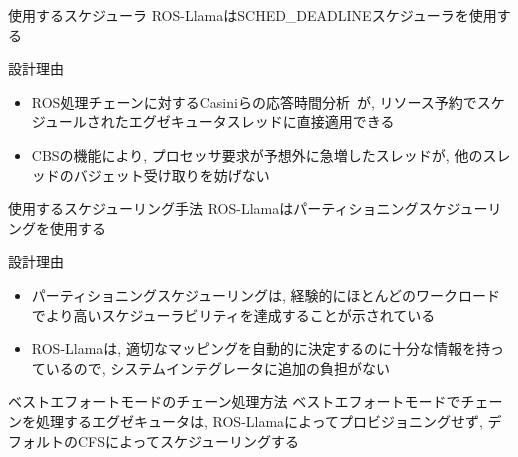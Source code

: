 \begin{frame}{使用するスケジューラ}
    ROS-LlamaはSCHED\_DEADLINEスケジューラを使用する
    \begin{block}{設計理由}
        \setlength{\linewidth}{0.98\columnwidth}
        \begin{itemize}
            \item ROS処理チェーンに対するCasiniらの応答時間分析~\cite{casini2019response}が, リソース予約でスケジュールされたエグゼキュータスレッドに直接適用できる
            \item CBSの機能により, プロセッサ要求が予想外に急増したスレッドが, 他のスレッドのバジェット受け取りを妨げない
        \end{itemize}
    \end{block}
\end{frame}

\begin{frame}{使用するスケジューリング手法}
    ROS-Llamaはパーティショニングスケジューリングを使用する
    \begin{block}{設計理由}
        \setlength{\linewidth}{0.98\columnwidth}
        \begin{itemize}
            \item パーティショニングスケジューリングは, 経験的にほとんどのワークロードでより高いスケジューラビリティを達成することが示されている~\cite{brandenburg2016global}
            \item ROS-Llamaは, 適切なマッピングを自動的に決定するのに十分な情報を持っているので, システムインテグレータに追加の負担がない
        \end{itemize}
    \end{block}
\end{frame}


\begin{frame}{ベストエフォートモードのチェーン処理方法}
    ベストエフォートモードでチェーンを処理するエグゼキュータは, ROS-Llamaによってプロビジョニングせず, デフォルトのCFSによってスケジューリングする
\end{frame}



